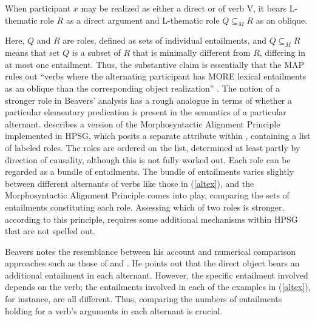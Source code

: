 \documentclass[output=paper
	        ,collection
	        ,collectionchapter
 	        ,biblatex
                ,babelshorthands
                ,newtxmath
                ,draftmode
                ,colorlinks, citecolor=brown
]{langscibook}
\begin{document}
\begin{exe}
\ex\label{beavers-map}
When participant $x$ may be realized as either a direct or  of verb V, it bears L-thematic role $R$ as a direct argument and L-thematic role $Q\subseteq_{M}R$ as an oblique.
\citep[848]{Beavers2010}
\end {exe}

\noindent
Here, $Q$ and $R$ are roles, defined as sets of individual entailments, and  $Q\subseteq_{M}R$ means that set $Q$ is a subset of $R$ that is minimally different from $R$, differing in at most one entailment.
Thus, the substantive claim is essentially that the MAP rules out ``verbs where the alternating participant has \textsc{MORE} lexical entailments as an oblique than the corresponding object realization'' \citep[849]{Beavers2010}.
The notion of a stronger role in Beavers' analysis has a rough analogue in terms of whether a particular elementary predication is present in the semantics of a particular alternant.
\citet{Beavers2005} describes a version of the Morphosyntactic Alignment Principle implemented in HPSG, which posits a separate  attribute within , containing a list of labeled roles.
The roles are ordered on the  list, determined at least partly by direction of causality, although this is not fully worked out.
Each role can be regarded as a bundle of entailments.
The bundle of entailments varies slightly between different alternants of verbs like those in (\ref{altex}), and the Morphosyntactic Alignment Principle comes into play, comparing the sets of entailments constituting each role.
Assessing which of two roles is stronger, according to this principle, requires some additional mechanisms within HPSG that are not spelled out.

Beavers notes the resemblance between his account and numerical comparison approaches such as those of \citet{Dowty1991} and \citet{AckermanandMoore2001}.
He points out that the direct object bears an additional entailment in each alternant. However, the specific entailment involved depends on the verb; the entailments involved in each of the examples in (\ref{altex}), for instance, are all different.  Thus, comparing the numbers of entailments holding for a verb's arguments in each alternant is crucial.
\end{document}
